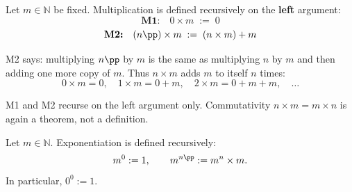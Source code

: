 
\begin{tcolorbox}[colback=defbox, colframe=defborder, arc=2pt,
  left=6pt, right=6pt, top=4pt, bottom=4pt,
  title={\small\textbf{Definition 2.3.1 (Multiplication)}},
  fonttitle=\small\bfseries]
Let $m \in \mathbb{N}$ be fixed. Multiplication is defined recursively
on the \textbf{left} argument:
\[
\textbf{M1:}\quad 0 \times m \;:=\; 0
\]
\[
\textbf{M2:}\quad (n\pp) \times m \;:=\; (n \times m) + m
\]
\end{tcolorbox}

\begin{remark}
M2 says: multiplying $n\pp$ by $m$ is the same as multiplying $n$ by $m$
and then adding one more copy of $m$.
Thus $n \times m$ adds $m$ to itself $n$ times:
\[
0 \times m = 0, \quad
1 \times m = 0 + m, \quad
2 \times m = 0 + m + m, \quad \ldots
\]
\end{remark}

\begin{remark}
M1 and M2 recurse on the left argument only.
Commutativity $n \times m = m \times n$ is again a theorem,
not a definition.
\end{remark}

\begin{definition}
\label{def:exp}
Let $m \in \mathbb{N}$. Exponentiation is defined recursively:
\[
m^0 := 1, \qquad m^{n\pp} := m^n \times m.
\]
In particular, $0^0 := 1$.
\end{definition}
